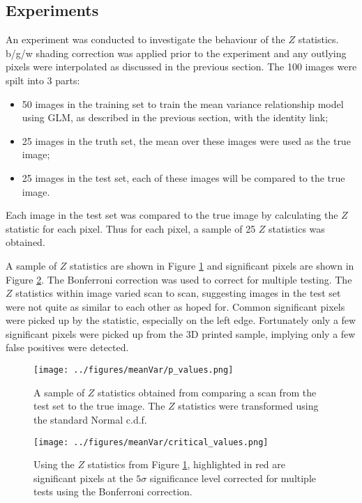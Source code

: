 \documentclass[a4paper]{proc}
\begin{document}
\subsection{Experiments}
An experiment was conducted to investigate the behaviour of the $Z$ statistics. b/g/w shading correction was applied prior to the experiment and any outlying pixels were interpolated as discussed in the previous section. The 100 images were spilt into 3 parts:
\begin{itemize}
	\item 50 images in the training set to train the mean variance relationship model using GLM, as described in the previous section, with the identity link;
	\item 25 images in the truth set, the mean over these images were used as the true image;
	\item 25 images in the test set, each of these images will be compared to the true image.
\end{itemize}
Each image in the test set was compared to the true image by calculating the $Z$ statistic for each pixel. Thus for each pixel, a sample of 25 $Z$ statistics was obtained.

A sample of $Z$ statistics are shown in Figure \ref{fig:p_values} and significant pixels are shown in Figure \ref{fig:critical_values}. The Bonferroni correction was used to correct for multiple testing. The $Z$ statistics within image varied scan to scan, suggesting images in the test set were not quite as similar to each other as hoped for. Common significant pixels were picked up by the statistic, especially on the left edge. Fortunately only a few significant pixels were picked up from the 3D printed sample, implying only a few false positives were detected.

\begin{figure}
	\centering
	\centerline{
	\texttt{[image: ../figures/meanVar/p\_values.png]}
	}
	\caption{A sample of $Z$ statistics obtained from comparing a scan from the test set to the true image. The $Z$ statistics were transformed using the standard Normal c.d.f.}
	\label{fig:p_values}
\end{figure}

\begin{figure}
	\centering
	\centerline{
	\texttt{[image: ../figures/meanVar/critical\_values.png]}
	}
	\caption{Using the $Z$ statistics from Figure \ref{fig:p_values}, highlighted in red are significant pixels at the $5\sigma$ significance level corrected for multiple tests using the Bonferroni correction.}
	\label{fig:critical_values}
\end{figure}
\end{document}
